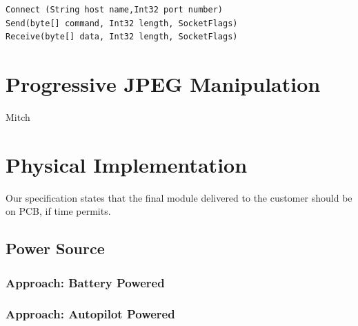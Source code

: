 \begin{lstlisting}[caption=Socket class connect receive and send method,label=socketClasscrs]
Connect (String host name,Int32 port number)
Send(byte[] command, Int32 length, SocketFlags)
Receive(byte[] data, Int32 length, SocketFlags)
\end{lstlisting}

\section{Progressive JPEG Manipulation}
Mitch

\section{Physical Implementation}

Our specification states that the final module delivered to the customer 
should be on PCB, if time permits. 
	
\subsection{Power Source}

\subsubsection{Approach: Battery Powered}

\subsubsection{Approach: Autopilot Powered}

